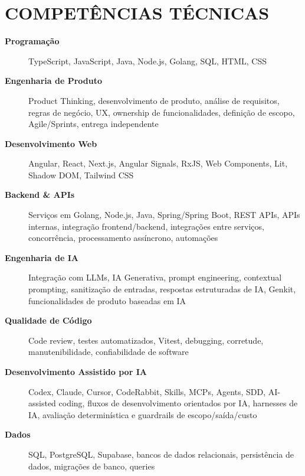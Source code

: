\documentclass[10pt,a4paper]{article}
\begin{document}

\section*{COMPETÊNCIAS TÉCNICAS}

\footnotesize

\begin{description}

    \item[\textbf{Programação}]
    TypeScript, JavaScript, Java, Node.js, Golang, SQL, HTML, CSS

    \item[\textbf{Engenharia de Produto}]
    Product Thinking, desenvolvimento de produto, análise de requisitos,
    regras de negócio, UX, ownership de funcionalidades,
    definição de escopo, Agile/Sprints, entrega independente

    \item[\textbf{Desenvolvimento Web}]
    Angular, React, Next.js, Angular Signals, RxJS,
    Web Components, Lit, Shadow DOM, Tailwind CSS

    \item[\textbf{Backend \& APIs}]
    Serviços em Golang, Node.js, Java, Spring/Spring Boot, REST APIs, APIs internas,
    integração frontend/backend, integrações entre serviços,
    concorrência, processamento assíncrono, automações

    \item[\textbf{Engenharia de IA}]
    Integração com LLMs, IA Generativa, prompt engineering,
    contextual prompting, sanitização de entradas,
    respostas estruturadas de IA, Genkit,
    funcionalidades de produto baseadas em IA

    \item[\textbf{Qualidade de Código}]
    Code review, testes automatizados, Vitest,
    debugging, corretude, manutenibilidade,
    confiabilidade de software

    \item[\textbf{Desenvolvimento Assistido por IA}]
    Codex, Claude, Cursor, CodeRabbit, Skills,
    MCPs, Agents, SDD, AI-assisted coding,
    fluxos de desenvolvimento orientados por IA, harnesses de IA,
    avaliação determinística e guardrails de escopo/saída/custo
    \vspace{12pt}

    \item[\textbf{Dados}]
    SQL, PostgreSQL, Supabase, bancos de dados relacionais,
    persistência de dados, migrações de banco,
    queries


\end{description}
\end{document}
